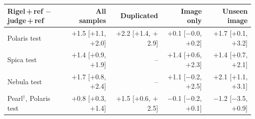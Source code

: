 \begin{tabular}{lrrrr}
\toprule
Rigel\,+\,ref $-$ judge\,+\,ref & All samples & Duplicated & Image only & Unseen image \\
\midrule
Polaris test & $+$1.5 [$+$1.1, $+$2.0] & $+$2.2 [$+$1.4, $+$2.9] & $+$0.1 [$-$0.0, $+$0.2] & $+$1.7 [$+$0.1, $+$3.2] \\
Spica test & $+$1.4 [$+$0.9, $+$1.9] & -- & $+$1.4 [$+$0.6, $+$2.3] & $+$1.4 [$+$0.7, $+$2.1] \\
Nebula test & $+$1.7 [$+$0.8, $+$2.4] & -- & $+$1.1 [$-$0.2, $+$2.5] & $+$2.1 [$+$1.1, $+$3.1] \\
\addlinespace
Pearl$^{\dagger}$, Polaris test & $+$0.8 [$+$0.3, $+$1.4] & $+$1.5 [$+$0.6, $+$2.5] & $-$0.1 [$-$0.2, $+$0.1] & $-$1.2 [$-$3.5, $+$0.9] \\
\bottomrule
\end{tabular}
